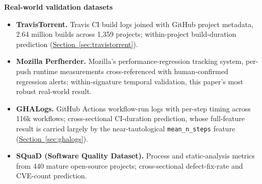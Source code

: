\documentclass[technologies,article,submit,pdftex,moreauthors]{Definitions/mdpi}
\providecommand{\tightlist}{%
  \setlength{\itemsep}{0pt}\setlength{\parskip}{0pt}}
\begin{document}
\textbf{Real-world validation datasets}

\begin{itemize}
\tightlist
\item
  \textbf{TravisTorrent.} Travis CI build logs joined with GitHub project metadata, 2.64 million builds across 1,359 projects; within-project build-duration prediction (\hyperref[sec:travistorrent]{Section~\ref*{sec:travistorrent}}).
\item
  \textbf{Mozilla Perfherder.} Mozilla's performance-regression tracking system, per-push runtime measurements cross-referenced with human-confirmed regression alerts; within-signature temporal validation, this paper's most robust real-world result.
\item
  \textbf{GHALogs.} GitHub Actions workflow-run logs with per-step timing across 116k workflows; cross-sectional CI-duration prediction, whose full-feature result is carried largely by the near-tautological \texttt{mean\_n\_steps} feature (\hyperref[sec:ghalogs]{Section~\ref*{sec:ghalogs}}).
\item
  \textbf{SQuaD (Software Quality Dataset).} Process and static-analysis metrics from 440 mature open-source projects; cross-sectional defect-fix-rate and CVE-count prediction.
\end{itemize}
\end{document}
